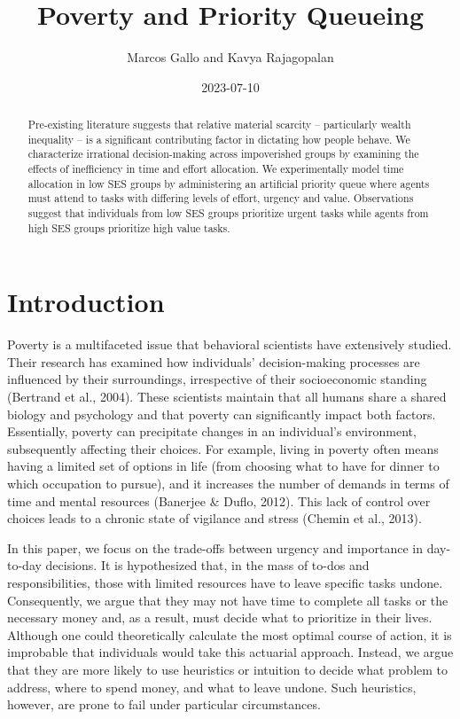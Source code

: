\documentclass[
]{article}
\title{Poverty and Priority Queueing}
\author{Marcos Gallo and Kavya Rajagopalan}
\date{2023-07-10}
\renewcommand*\contentsname{Table of contents}
\newcommand\contentsname{Table of contents}
\begin{document}
\maketitle
\begin{abstract}
Pre-existing literature suggests that relative material scarcity --
particularly wealth inequality -- is a significant contributing factor
in dictating how people behave. We characterize irrational
decision-making across impoverished groups by examining the effects of
inefficiency in time and effort allocation. We experimentally model time
allocation in low SES groups by administering an artificial priority
queue where agents must attend to tasks with differing levels of effort,
urgency and value. Observations suggest that individuals from low SES
groups prioritize urgent tasks while agents from high SES groups
prioritize high value tasks.
\end{abstract}
\ifdefined\Shaded\renewenvironment{Shaded}{\begin{tcolorbox}[interior hidden, borderline west={3pt}{0pt}{shadecolor}, sharp corners, frame hidden, enhanced, boxrule=0pt, breakable]}{\end{tcolorbox}}\fi

\renewcommand*\contentsname{Table of contents}
{
\hypersetup{linkcolor=}
\setcounter{tocdepth}{3}
\tableofcontents
}
\hypertarget{introduction}{%
\section{Introduction}\label{introduction}}

Poverty is a multifaceted issue that behavioral scientists have
extensively studied. Their research has examined how individuals'
decision-making processes are influenced by their surroundings,
irrespective of their socioeconomic standing (Bertrand et al., 2004).
These scientists maintain that all humans share a shared biology and
psychology and that poverty can significantly impact both factors.
Essentially, poverty can precipitate changes in an individual's
environment, subsequently affecting their choices. For example, living
in poverty often means having a limited set of options in life (from
choosing what to have for dinner to which occupation to pursue), and it
increases the number of demands in terms of time and mental resources
(Banerjee \& Duflo, 2012). This lack of control over choices leads to a
chronic state of vigilance and stress (Chemin et al., 2013).

In this paper, we focus on the trade-offs between urgency and importance
in day-to-day decisions. It is hypothesized that, in the mass of to-dos
and responsibilities, those with limited resources have to leave
specific tasks undone. Consequently, we argue that they may not have
time to complete all tasks or the necessary money and, as a result, must
decide what to prioritize in their lives. Although one could
theoretically calculate the most optimal course of action, it is
improbable that individuals would take this actuarial approach. Instead,
we argue that they are more likely to use heuristics or intuition to
decide what problem to address, where to spend money, and what to leave
undone. Such heuristics, however, are prone to fail under particular
circumstances.
\end{document}
